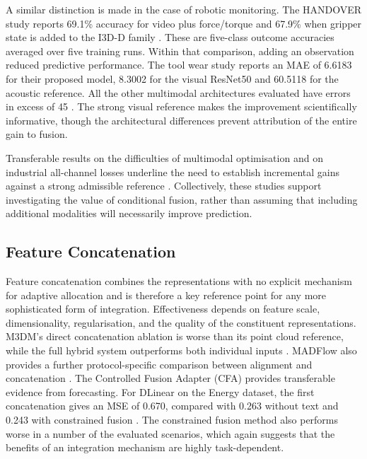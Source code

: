 A similar distinction is made in the case of robotic monitoring. The HANDOVER study reports 69.1\%
accuracy for video plus force/torque and 67.9\% when gripper state is added to the I3D-D family
\parencite[Table~III]{Thoduka2024Handover}.
These are five-class outcome accuracies averaged over five training runs. Within that comparison, adding an observation reduced predictive performance.
The tool wear study reports an MAE of 6.6183 for their proposed model, 8.3002 for the visual
ResNet50 and 60.5118 for the acoustic reference. All the other multimodal architectures evaluated
have errors in excess of 45 \parencite[Table~1]{P045}.
The strong visual reference makes the improvement scientifically informative, though the
architectural differences prevent attribution of the entire gain to fusion.

Transferable results on the difficulties of multimodal optimisation and on industrial all-channel
losses underline the need to establish incremental gains against a strong admissible reference
\parencite{Wang2020What,Goodarzi2023Deep}.
Collectively, these studies support investigating the value of conditional fusion, rather than
assuming that including additional modalities will necessarily improve prediction.

\subsection{Feature Concatenation}

Feature concatenation combines the representations with no explicit mechanism for adaptive
allocation and is therefore a key reference point for any more sophisticated form of integration.
Effectiveness depends on feature scale, dimensionality, regularisation, and the quality of the
constituent representations.
M3DM's direct concatenation ablation is worse than its point cloud reference, while the full hybrid
system outperforms both individual inputs \parencite[Table~4]{Wang2023Multimodal}.
MADFlow also provides a further protocol-specific comparison between alignment and concatenation
\parencite{Li2025MADFlow}.
The Controlled Fusion Adapter (CFA) provides transferable evidence from forecasting. For DLinear on the Energy dataset, the first
concatenation gives an MSE of 0.670, compared with 0.263 without text and 0.243 with constrained fusion
\parencite[Table~4]{P023}.
The constrained fusion method also performs worse in a number of the evaluated scenarios, which
again suggests that the benefits of an integration mechanism are highly task-dependent.

